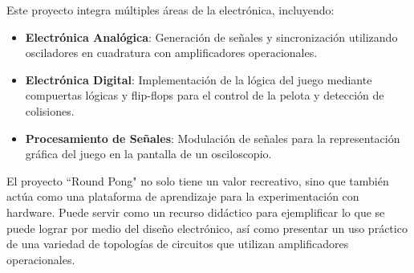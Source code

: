 Este proyecto integra múltiples áreas de la electrónica, incluyendo:
\begin{itemize}
    \item \textbf{Electrónica Analógica}: Generación de señales y sincronización utilizando osciladores en cuadratura con amplificadores operacionales.
    \item \textbf{Electrónica Digital}: Implementación de la lógica del juego mediante compuertas lógicas y flip-flops para el control de la pelota y detección de colisiones.
    \item \textbf{Procesamiento de Señales}: Modulación de señales para la representación gráfica del juego en la pantalla de un osciloscopio. 
\end{itemize}

El proyecto ``Round Pong" no solo tiene un valor recreativo, sino que también actúa como una plataforma de aprendizaje para la experimentación con hardware. 
Puede servir como un recurso didáctico para ejemplificar lo que se puede lograr por medio del diseño electrónico, así como presentar un uso práctico de una variedad de topologías de circuitos que utilizan amplificadores operacionales.